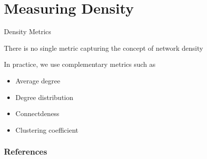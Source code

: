 \documentclass[notes, aspectratio=1610]{beamer}
\begin{document}
\section{Measuring Density}

\begin{frame}{Density Metrics}
	\begin{tcolorbox}[
		colback=comp_c!5!white,
		colframe=comp_c!90!black,
		title={\centering !! Pay attention !!}]
		There is no single metric capturing the concept of network density
	\end{tcolorbox}

	\vspace{2em}

	In practice, we use complementary metrics such as 

	\begin{itemize}
		\item Average degree 
		\item Degree distribution 
		\item Connectdeness
		\item Clustering coefficient
	\end{itemize}
\end{frame}

\begin{frame}
	\frametitle{References}
	\printbibliography
 \end{frame} 

\end{document}
